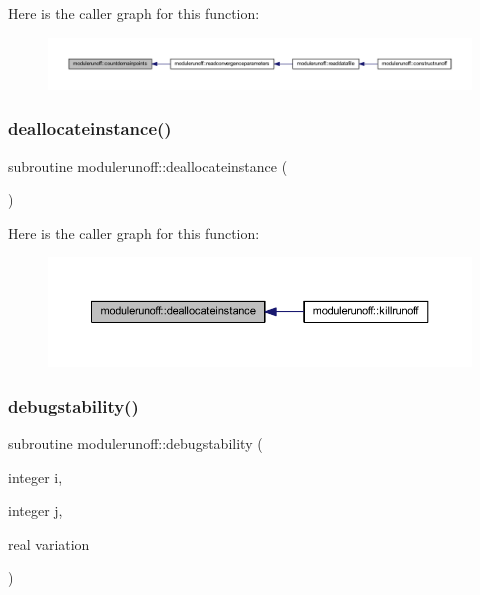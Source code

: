 Here is the caller graph for this function\+:\nopagebreak
\begin{figure}[H]
\begin{center}
\leavevmode
\includegraphics[width=350pt]{namespacemodulerunoff_a6dee0b7b0f34390926e9ca24de451565_icgraph}
\end{center}
\end{figure}
\mbox{\label{namespacemodulerunoff_ad9192dfb595b8f16119a042aa13d95c4}} 
\subsubsection{\texorpdfstring{deallocateinstance()}{deallocateinstance()}}
{\footnotesize\ttfamily subroutine modulerunoff\+::deallocateinstance (\begin{DoxyParamCaption}{ }\end{DoxyParamCaption})\hspace{0.3cm}{\ttfamily [private]}}

Here is the caller graph for this function\+:\nopagebreak
\begin{figure}[H]
\begin{center}
\leavevmode
\includegraphics[width=350pt]{namespacemodulerunoff_ad9192dfb595b8f16119a042aa13d95c4_icgraph}
\end{center}
\end{figure}
\mbox{\label{namespacemodulerunoff_ad470166654c51ff37fe83cafeef5a424}} 
\subsubsection{\texorpdfstring{debugstability()}{debugstability()}}
{\footnotesize\ttfamily subroutine modulerunoff\+::debugstability (\begin{DoxyParamCaption}\item[{integer}]{i,  }\item[{integer}]{j,  }\item[{real}]{variation }\end{DoxyParamCaption})\hspace{0.3cm}{\ttfamily [private]}}

